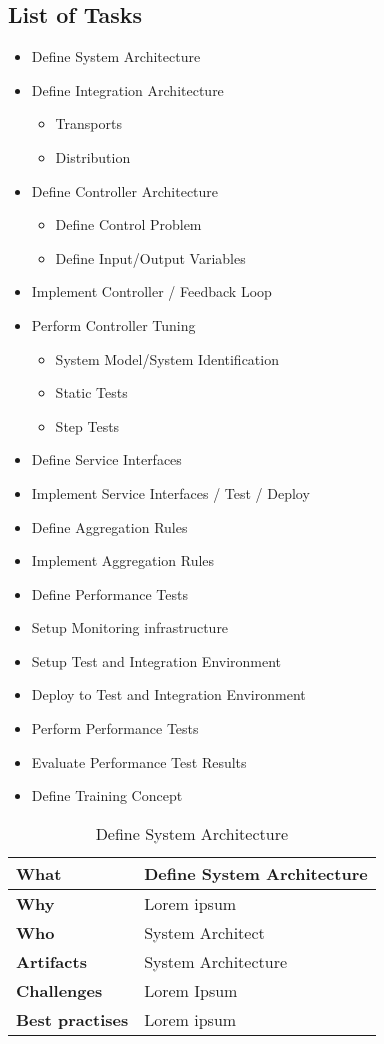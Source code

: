 \subsection{List of Tasks}
\begin{itemize}
	\item Define System Architecture 
	\item Define Integration Architecture
	\begin{itemize}
		\item Transports
		\item Distribution
	\end{itemize}
	\item Define Controller Architecture 
	\begin{itemize}
		\item Define Control Problem 
		\item Define Input/Output Variables 
	\end{itemize}
	\item Implement Controller / Feedback Loop
	\item Perform Controller Tuning 
	\begin{itemize}
		\item System Model/System Identification 
		\item Static Tests
		\item Step Tests
	\end{itemize}
	\item Define Service Interfaces
	\item Implement Service Interfaces / Test / Deploy
	\item Define Aggregation Rules
	\item Implement Aggregation Rules 
	\item Define Performance Tests 
	\item Setup Monitoring infrastructure
	\item Setup Test and Integration Environment
	\item Deploy to Test and Integration Environment
	\item Perform Performance Tests
	\item Evaluate Performance Test Results
	\item Define Training Concept
\end{itemize}
\begin{table}
	[h!] \caption{Define System Architecture} \label{table:ch6_Task_Define_System_Architect} \centering 
	\begin{tabular}
		{|m{3cm}|m{10cm}|} \hline \bfseries What & Define System Architecture\\
		\hline \bfseries Why & Lorem ipsum\\
		\hline \bfseries Who & System Architect\\
		\hline \bfseries Artifacts & System Architecture\\
		\hline \bfseries Challenges & Lorem Ipsum\\
		\hline \bfseries Best practises & Lorem ipsum\\
		\hline 
	\end{tabular}
\end{table}

